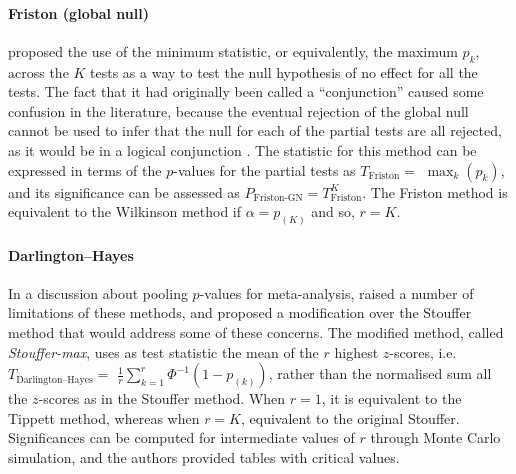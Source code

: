 \paragraph{Friston (global null)} \citet{Friston1999} proposed the use of the minimum statistic, or equivalently, the maximum $p_{k}$, across the $K$ tests as a way to test the null hypothesis of no effect for all the tests. The fact that it had originally been called a ``conjunction'' caused some confusion in the literature, because the eventual rejection of the global null cannot be used to infer that the null for each of the partial tests are all rejected, as it would be in a logical conjunction \citep{Nichols2005}. The statistic for this method can be expressed in terms of the $p$-values for the partial tests as $T_{\text{Friston}}=$ $\max_{k} \left(p_{k}\right)$, and its significance can be assessed as $P_{\text{Friston-GN}}=T^{K}_{\text{Friston}}$. The Friston method is equivalent to the Wilkinson method if $\alpha=p_{(K)}$ and so, $r=K$.

\paragraph{Darlington--Hayes} In a discussion about pooling $p$-values for meta-analysis, \citet{Darlington2000} raised a number of limitations of these methods, and proposed a modification over the Stouffer method that would address some of these concerns. The modified method, called \emph{Stouffer-max}, uses as test statistic the mean of the $r$ highest $z$-scores, i.e. $T_{\text{Darlington--Hayes}} =$ $\frac{1}{r} \sum_{k=1}^{r} \Phi^{-1}\left(1-p_{(k)}\right)$, rather than the normalised sum all the $z$-scores as in the Stouffer method. When $r=1$, it is equivalent to the Tippett method, whereas when $r=K$, equivalent to the original Stouffer. Significances can be computed for intermediate values of $r$ through Monte Carlo simulation, and the authors provided tables with critical values.


